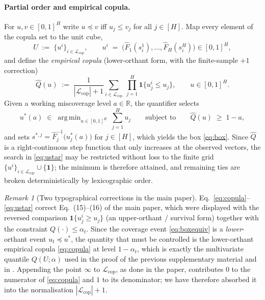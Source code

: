 \documentclass[11pt]{article}
\theoremstyle{definition}
\theoremstyle{remark}
\newtheorem{remark}[theorem]{Remark}
\DeclareMathOperator*{\argmin}{arg\,min}
\newcommand{\R}{\mathbb{R}}
\newcommand{\ind}{\mathbf{1}}
\newcommand{\Lcop}{\mathcal{L}_{\mathrm{cop}}}
\newcommand{\horizon}{[H]}
\begin{document}
\paragraph{Partial order and empirical copula.}
For $u,v\in[0,1]^{H}$ write $u\preceq v$ iff $u_j\le v_j$ for all
$j\in\horizon$. Map every element of the copula set to the unit cube,
\begin{equation}
  U\;:=\;\bigl\{u^{i}\bigr\}_{i\in\Lcop},
  \qquad
  u^{i}\;=\;\bigl(\widehat{F}_1(s_i^{1}),\dots,\widehat{F}_H(s_i^{H})\bigr)
  \in[0,1]^{H},
  \label{eq:U}
\end{equation}
and define the \emph{empirical copula} (lower-orthant form, with the
finite-sample $+1$ correction)
\begin{equation}
  \widehat{Q}(u)
  \;:=\;\frac{1}{|\Lcop|+1}
  \sum_{i\in\Lcop}\ \prod_{j=1}^{H}\ind\bigl\{u_j^{i}\le u_j\bigr\},
  \qquad u\in[0,1]^{H}.
  \label{eq:copula}
\end{equation}
Given a working miscoverage level $a\in\R$, the quantifier selects
\begin{equation}
  u^{*}(a)\;\in\;\argmin_{u\in[0,1]^{H}}\ \sum_{j=1}^{H}u_j
  \qquad\text{subject to}\qquad
  \widehat{Q}(u)\;\ge\;1-a ,
  \label{eq:ustar}
\end{equation}
and sets $s^{*,j}=\widehat{F}_j^{-1}\bigl(u^{*}_j(a)\bigr)$ for $j\in\horizon$,
which yields the box \eqref{eq:box}. Since $\widehat{Q}$ is a right-continuous
step function that only increases at the observed vectors, the search in
\eqref{eq:ustar} may be restricted without loss to the finite grid
$\{u^{i}\}_{i\in\Lcop}\cup\{\boldsymbol{1}\}$; the minimum is therefore
attained, and remaining ties are broken deterministically by lexicographic
order.

\begin{remark}[Two typographical corrections in the main paper]
\label{rem:eq1516}
Eq.~\eqref{eq:copula}--\eqref{eq:ustar} correct Eq.~(15)--(16) of the main
paper, which were displayed with the reversed comparison
$\ind\{u^i_j\ge u_j\}$ (an upper-orthant / survival form) together with the
constraint $Q(\cdot)\le\alpha_t$. Since the coverage event
\eqref{eq:boxequiv} is a \emph{lower}-orthant event $u_t\preceq u^{*}$, the
quantity that must be controlled is the lower-orthant empirical copula
\eqref{eq:copula} at level $1-\alpha_t$, which is exactly the multivariate
quantile $Q(U;\alpha)$ used in the proof of the previous supplementary
material and in \cite{sunyu2024}. Appending the point
$\boldsymbol{\infty}$ to $\Lcop$, as done in the paper, contributes $0$ to the
numerator of \eqref{eq:copula} and $1$ to its denominator; we have therefore
absorbed it into the normalisation $|\Lcop|+1$.
\end{remark}
\end{document}
